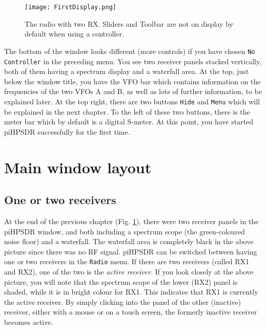 \documentclass[12pt]{book}
\def\rett#1{\texttt{\color{red}#1}}
\def\pH{pi\-HPSDR\xspace}
\begin{document}
\begin{figure}
\center
\texttt{[image: FirstDisplay.png]}
\caption{The radio with two RX. Sliders and Toolbar are not on display
by default when using a controller.}
\label{fig:FirstDisplay}
\end{figure}

The bottom of the window looks different (more controls) if you have chosen \rett{No Controller} in the
preceding menu.
You see two receiver panels stacked vertically, both of them having a spectrum display and a waterfall area.
At the top,
just below the window title, you have the VFO bar which contains information on the frequencies of the two
VFOs A and B,
as well as lots of further information, to be explained later. At the top right, there are two buttons
\rett{Hide}
and \rett{Menu} which will be explained in the next chapter. To the left of these two buttons, there is the
meter bar which by default is a digital S-meter. At this point, you have started \pH successfully for
the first time.

\chapter{Main window layout}

\section{One or two receivers}
At the end of the previous chapter (Fig. \ref{fig:FirstDisplay}),
there were two receiver panels in the
\pH window, and both including a spectrum scope
(the green-coloured noise floor) and a waterfall. The waterfall area
is completely black in the above picture since there was no RF signal.
\pH can be switched between having one or two receivers in the
\texttt{Radio} menu. If there are two receivers (called RX1 and RX2),
one of the two is the \textit{active receiver}. If you look closely
at the above picture, you will note that the spectrum scope of
the lower (RX2) panel is shaded, while it is in bright colour for RX1.
This indicates that RX1 is currently the active receiver. By simply
clicking into the panel of the other (inactive) receiver, either with
a mouse or on a touch screen, the formerly inactive receiver becomes
active.
\end{document}
